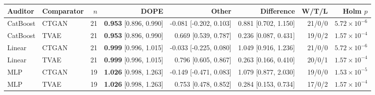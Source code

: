 \begin{tabular}{@{}llrrrrrr@{}}
\toprule
Auditor & Comparator & $n$ & DOPE & Other & Difference & W/T/L & Holm $p$ \\
\midrule
CatBoost & CTGAN & 21 & \textbf{0.953} [0.896, 0.990] & -0.081 [-0.202, 0.103] & 0.881 [0.702, 1.150] & 21/0/0 & $5.72\times 10^{-6}$ \\
CatBoost & TVAE & 21 & \textbf{0.953} [0.896, 0.990] & 0.669 [0.539, 0.787] & 0.236 [0.087, 0.431] & 19/0/2 & $1.57\times 10^{-4}$ \\
Linear & CTGAN & 21 & \textbf{0.999} [0.996, 1.015] & -0.033 [-0.225, 0.080] & 1.049 [0.916, 1.236] & 21/0/0 & $5.72\times 10^{-6}$ \\
Linear & TVAE & 21 & \textbf{0.999} [0.996, 1.015] & 0.796 [0.605, 0.867] & 0.263 [0.166, 0.410] & 20/0/1 & $1.57\times 10^{-4}$ \\
MLP & CTGAN & 19 & \textbf{1.026} [0.998, 1.263] & -0.149 [-0.471, 0.083] & 1.079 [0.877, 2.030] & 19/0/0 & $1.53\times 10^{-5}$ \\
MLP & TVAE & 19 & \textbf{1.026} [0.998, 1.263] & 0.753 [0.478, 0.852] & 0.284 [0.153, 0.734] & 17/0/2 & $1.57\times 10^{-4}$ \\
\bottomrule
\end{tabular}
